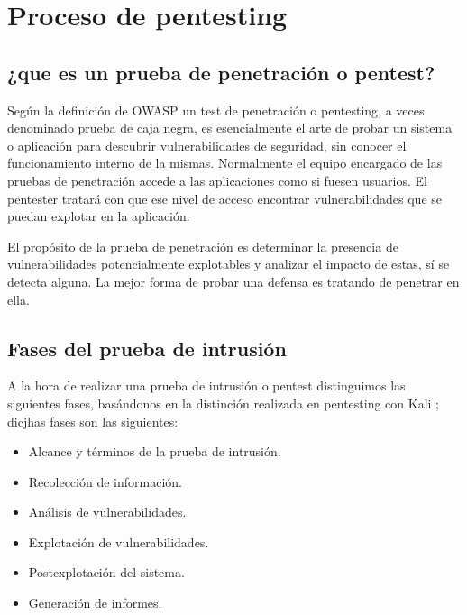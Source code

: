 
\section{Proceso de pentesting} 

\subsection{¿que es un prueba de penetración o pentest?}
Según la definición de OWASP \autocite{web1} un test de penetración o pentesting, a veces denominado 
prueba de caja negra, es esencialmente el arte de probar
un sistema o aplicación para descubrir vulnerabilidades de seguridad, sin conocer el funcionamiento interno de la mismas. Normalmente el equipo 
encargado de las pruebas de penetración accede a las aplicaciones como si fuesen usuarios. El pentester tratará con 
que ese nivel de acceso encontrar vulnerabilidades que se puedan explotar en la aplicación.

El propósito de la prueba de penetración es determinar la presencia 
de vulnerabilidades potencialmente explotables y analizar el impacto de estas,
sí se detecta alguna. La mejor forma de probar una defensa es tratando de penetrar en ella.
\newpage

\subsection{Fases del prueba de intrusión}
A la hora de realizar una prueba de intrusión o pentest distinguimos las siguientes fases, basándonos en 
la distinción realizada en pentesting con Kali  \autocite{ref1};  dicjhas fases son las siguientes:
\begin{itemize}
    \item Alcance y términos de la prueba de intrusión.
    \item Recolección de información.
    \item Análisis de vulnerabilidades.
    \item Explotación de vulnerabilidades.
    \item Postexplotación del sistema.
    \item Generación de informes.
\end{itemize}
